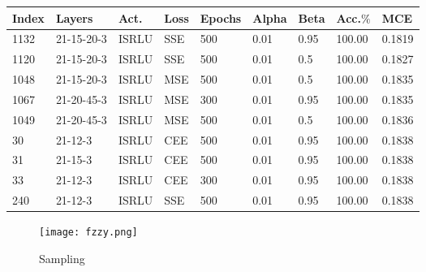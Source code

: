 \begin{table}[hbt]
    \centering
    \begin{tabular}{|l|l|l|l|l|l|l|l|l|}
    \hline
        Index & Layers & Act. & Loss & Epochs & Alpha & Beta & Acc.\(\%\) & MCE \\ \hline
        1132 & 21-15-20-3 & ISRLU & SSE & 500 & 0.01 & 0.95 & 100.00 & 0.1819 \\ \hline
        1120 & 21-15-20-3 & ISRLU & SSE & 500 & 0.01 & 0.5 & 100.00 & 0.1827 \\ \hline
        1048 & 21-15-20-3 & ISRLU & MSE & 500 & 0.01 & 0.5 & 100.00 & 0.1835 \\ \hline
        1067 & 21-20-45-3 & ISRLU & MSE & 300 & 0.01 & 0.95 & 100.00 & 0.1835 \\ \hline
        1049 & 21-20-45-3 & ISRLU & MSE & 500 & 0.01 & 0.5 & 100.00 & 0.1836 \\ \hline
        30 & 21-12-3 & ISRLU & CEE & 500 & 0.01 & 0.95 & 100.00& 0.1838 \\ \hline
        31 & 21-15-3 & ISRLU & CEE & 500 & 0.01 & 0.95 & 100.00& 0.1838 \\ \hline
        33 & 21-12-3 & ISRLU & CEE & 300 & 0.01 & 0.95 & 100.00& 0.1838 \\ \hline
        240 & 21-12-3 & ISRLU & SSE & 500 & 0.01 & 0.95 & 100.00 & 0.1838 \\ \hline
    \end{tabular}
\end{table}

\begin{figure}
    \centering
    \texttt{[image: fzzy.png]}
    \caption{Sampling}
    \label{fig:sampling}
\end{figure}